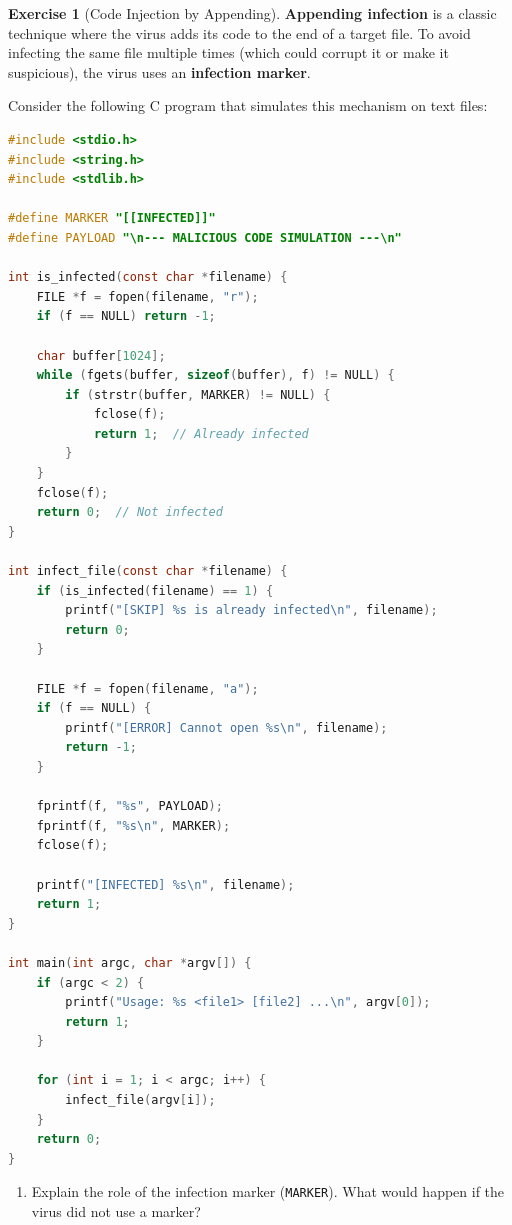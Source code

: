 \documentclass[a4paper,11pt]{article}
\theoremstyle{plain}
\theoremstyle{definition}
\newtheorem{exercice}{Exercise}
\begin{document}
\bigskip


\begin{exercice}[Code Injection by Appending]

\textbf{Appending infection} is a classic technique where the virus adds its code to the end of a target file. To avoid infecting the same file multiple times (which could corrupt it or make it suspicious), the virus uses an \textbf{infection marker}.

Consider the following C program that simulates this mechanism on text files:

\begin{lstlisting}[language=C]
#include <stdio.h>
#include <string.h>
#include <stdlib.h>

#define MARKER "[[INFECTED]]"
#define PAYLOAD "\n--- MALICIOUS CODE SIMULATION ---\n"

int is_infected(const char *filename) {
    FILE *f = fopen(filename, "r");
    if (f == NULL) return -1;

    char buffer[1024];
    while (fgets(buffer, sizeof(buffer), f) != NULL) {
        if (strstr(buffer, MARKER) != NULL) {
            fclose(f);
            return 1;  // Already infected
        }
    }
    fclose(f);
    return 0;  // Not infected
}

int infect_file(const char *filename) {
    if (is_infected(filename) == 1) {
        printf("[SKIP] %s is already infected\n", filename);
        return 0;
    }

    FILE *f = fopen(filename, "a");
    if (f == NULL) {
        printf("[ERROR] Cannot open %s\n", filename);
        return -1;
    }

    fprintf(f, "%s", PAYLOAD);
    fprintf(f, "%s\n", MARKER);
    fclose(f);

    printf("[INFECTED] %s\n", filename);
    return 1;
}

int main(int argc, char *argv[]) {
    if (argc < 2) {
        printf("Usage: %s <file1> [file2] ...\n", argv[0]);
        return 1;
    }

    for (int i = 1; i < argc; i++) {
        infect_file(argv[i]);
    }
    return 0;
}
\end{lstlisting}

\begin{enumerate}
\item Explain the role of the infection marker (\texttt{MARKER}). What would happen if the virus did not use a marker?


\end{enumerate}
\end{exercice}
\end{document}
